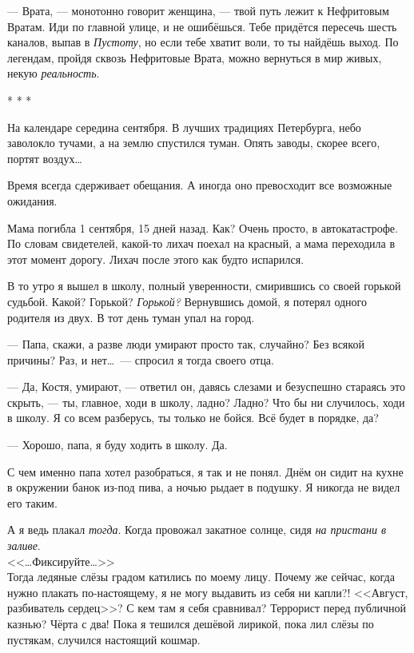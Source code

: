 \documentclass[openany, oneside]{book}
\begin{document}
--- Врата, --- монотонно говорит женщина, --- твой путь лежит к Нефритовым Вратам. Иди по главной улице, и не ошибёшься. Тебе придётся пересечь шесть каналов, выпав в \textit{Пустоту}, но если тебе хватит воли, то ты найдёшь выход. По легендам, пройдя сквозь Нефритовые Врата, можно вернуться в мир живых, некую \textit{реальность}.


\begin{center}
    * * *
\end{center}

На календаре середина сентября. В лучших традициях Петербурга, небо заволокло тучами, а на землю спустился туман. Опять заводы, скорее всего, портят воздух\dots

Время всегда сдерживает обещания. А иногда оно превосходит все возможные ожидания.

Мама погибла 1 сентября, 15 дней назад. Как? Очень просто, в автокатастрофе. По словам свидетелей, какой-то лихач поехал на красный, а мама переходила в этот момент дорогу. Лихач после этого как будто испарился.

В то утро я вышел в школу, полный уверенности, смирившись со своей горькой судьбой. Какой? Горькой? \textit{Горькой?} Вернувшись домой, я потерял одного родителя из двух. В тот день туман упал на город.

--- Папа, скажи, а разве люди умирают просто так, случайно? Без всякой причины? Раз, и нет\dots \ --- спросил я тогда своего отца.

--- Да, Костя, умирают, --- ответил он, давясь слезами и безуспешно стараясь это скрыть, --- ты, главное, ходи в школу, ладно? Ладно? Что бы ни случилось, ходи в школу. Я со всем разберусь, ты только не бойся. Всё будет в порядке, да?

--- Хорошо, папа, я буду ходить в школу. Да.

С чем именно папа хотел разобраться, я так и не понял. Днём он сидит на кухне в окружении банок из-под пива, а ночью рыдает в подушку. Я никогда не видел его таким.

А я ведь плакал \textit{тогда}. Когда провожал закатное солнце, сидя \textit{на пристани в заливе}.\\

<<\dots Фиксируйте\dots>>\\

Тогда ледяные слёзы градом катились по моему лицу. Почему же сейчас, когда нужно плакать по-настоящему, я не могу выдавить из себя ни капли?! <<Август, разбиватель сердец>>? С кем там я себя сравнивал? Террорист перед публичной казнью? Чёрта с два! Пока я тешился дешёвой лирикой, пока лил слёзы по пустякам, случился настоящий кошмар.
\end{document}
